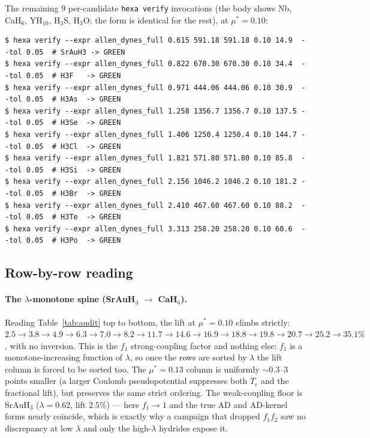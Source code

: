\documentclass[11pt,a4paper]{article}
\begin{document}
\noindent The remaining $9$ per-candidate \texttt{hexa verify} invocations (the
body shows Nb, CaH$_6$, YH$_{10}$, H$_3$S, H$_3$O; the form is identical for the
rest), at $\mu^*{=}0.10$:

\begin{lstlisting}[basicstyle=\ttfamily\footnotesize,frame=single,xleftmargin=0pt]
$ hexa verify --expr allen_dynes_full 0.615 591.18 591.18 0.10 14.9  --tol 0.05  # SrAuH3 -> GREEN
$ hexa verify --expr allen_dynes_full 0.822 670.30 670.30 0.10 34.4  --tol 0.05  # H3F   -> GREEN
$ hexa verify --expr allen_dynes_full 0.971 444.06 444.06 0.10 30.9  --tol 0.05  # H3As  -> GREEN
$ hexa verify --expr allen_dynes_full 1.258 1356.7 1356.7 0.10 137.5 --tol 0.05  # H3Se  -> GREEN
$ hexa verify --expr allen_dynes_full 1.406 1250.4 1250.4 0.10 144.7 --tol 0.05  # H3Cl  -> GREEN
$ hexa verify --expr allen_dynes_full 1.821 571.80 571.80 0.10 85.8  --tol 0.05  # H3Si  -> GREEN
$ hexa verify --expr allen_dynes_full 2.156 1046.2 1046.2 0.10 181.2 --tol 0.05  # H3Br  -> GREEN
$ hexa verify --expr allen_dynes_full 2.410 467.60 467.60 0.10 88.2  --tol 0.05  # H3Te  -> GREEN
$ hexa verify --expr allen_dynes_full 3.313 258.20 258.20 0.10 60.6  --tol 0.05  # H3Po  -> GREEN
\end{lstlisting}

\subsection{Row-by-row reading}
\label{app:rowbyrow}

\paragraph{The $\lambda$-monotone spine (SrAuH$_3$ $\to$ CaH$_6$).}
Reading Table~\ref{tab:audit} top to bottom, the lift at $\mu^*{=}0.10$ climbs
strictly: $2.5 \to 3.8 \to 4.9 \to 6.3 \to 7.0 \to 8.2 \to 11.7 \to 14.6 \to
16.9 \to 18.8 \to 19.8 \to 20.7 \to 25.2 \to 35.1\%$, with no inversion. This is
the $f_1$ strong-coupling factor and nothing else: $f_1$ is a monotone-increasing
function of $\lambda$, so once the rows are sorted by $\lambda$ the lift column is
forced to be sorted too. The $\mu^*{=}0.13$ column is uniformly $\sim$$0.3$--$3$
points smaller (a larger Coulomb pseudopotential suppresses both $T_c$ and the
fractional lift), but preserves the same strict ordering. The weak-coupling floor
is SrAuH$_3$ ($\lambda{=}0.62$, lift $2.5\%$) --- here $f_1\!\to\!1$ and the true
AD and AD-kernel forms nearly coincide, which is exactly why a campaign that
dropped $f_1 f_2$ saw no discrepancy at low $\lambda$ and only the high-$\lambda$
hydrides expose it.
\end{document}
